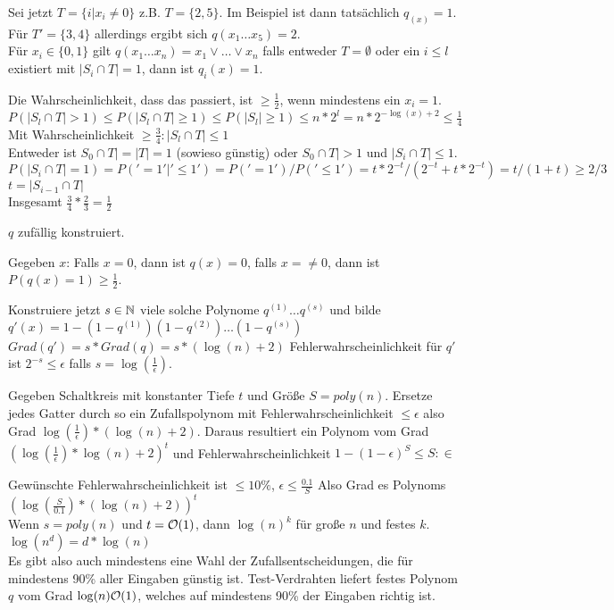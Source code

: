 \begin{beweis}
    Sei jetzt $T = \{i | x_i \neq 0 \}$ z.B. $T = \{2,5\}$.
    Im Beispiel ist dann tatsächlich $q_(x) = 1$.
    Für $T' = \{3,4\}$ allerdings ergibt sich $q(x_1 \dots x_5) = 2$.
    \\
    Für $x_i \in \{0,1\}$ gilt $q(x_1 \dots x_n) = x_1 \lor \dots \lor x_n$
    falls entweder $T = \emptyset$ oder ein $i \leq l$ existiert mit $| S_i \cap
    T | = 1$,
    dann ist $q_i(x) = 1$.

    Die Wahrscheinlichkeit, dass das passiert, ist $\geq \frac{1}{2}$, wenn
    mindestens ein $x_i = 1$.
    \\
    $P(|S_l \cap T| > 1) \leq P(|S_l \cap T| \geq 1) \leq P(|S_l| \geq 1) \leq n
    * 2^l = n * 2^{-\log(x) + 2} \leq \frac{1}{4}$
    \\
    Mit Wahrscheinlichkeit $\geq \frac{3}{4}: |S_l \cap T| \leq 1$
    \\
    Entweder ist $S_0 \cap T| = |T| = 1$ (sowieso günstig) oder $S_0 \cap T| >
    1$ und $|S_i \cap T| \leq 1$.
    \\
    $P(|S_i \cap T| = 1) = P('=1' | '\leq 1') = P('=1') / P('\leq 1') = t *
    2^{-t} / (2^{-t} + t * 2^{-t}) = t / (1 + t) \geq 2/3$
    \\
    $t = |S_{i-1} \cap T|$
    \\
    Insgesamt $\frac{3}{4} * \frac{2}{3} = \frac{1}{2}$

    $q$ zufällig konstruiert.

    Gegeben $x$: Falls $x = 0$, dann ist $q(x) = 0$, falls $x = \neq 0$, dann
    ist $P(q(x) = 1) \geq \frac{1}{2}$.

    Konstruiere jetzt $s \in \mathbb{N}$ viele solche Polynome $q^{(1)} \dots q^{(s)}$
    und bilde
    $q'(x) = 1 - (1 - q^{(1)}) (1 - q^{(2)}) \dots (1 - q^{(s)})$
    \\
    $Grad(q') = s * Grad(q) = s * (\log(n) + 2)$
    Fehlerwahrscheinlichkeit für $q'$ ist $2^{-s} \leq \epsilon$ falls $s =
    \log(\frac{1}{\epsilon})$.

    Gegeben Schaltkreis mit konstanter Tiefe $t$ und Größe $S = poly(n)$.
    Ersetze jedes Gatter durch so ein Zufallspolynom mit
    Fehlerwahrscheinlichkeit $\leq \epsilon$ also Grad $\log(\frac{1}{\epsilon})
    * (\log(n) + 2)$.
    Daraus resultiert ein Polynom vom Grad $(\log(\frac{1}{\epsilon}) * \log(n)
    + 2)^t $ und Fehlerwahrscheinlichkeit $1 - (1 - \epsilon)^S \leq S:\in$

    Gewünschte Fehlerwahrscheinlichkeit ist $\leq 10\%$, $\epsilon \leq
    \frac{0.1}{S}$
    Also Grad es Polynoms $(\log(\frac{S}{0.1}) * (\log(n) + 2))^t$
    \\
    Wenn $s = poly(n)$ und $t = \mathcal{O}(1)$, dann $\log(n)^k$ für große $n$ und
    festes $k$.
    \\
    $\log(n^d) = d * \log(n)$
    \\
    Es gibt also auch mindestens eine Wahl der Zufallsentscheidungen, die für
    mindestens 90\% aller Eingaben günstig ist. Test-Verdrahten liefert festes
    Polynom $q$ vom Grad $\log(n) \mathcal{O}(1)$, welches auf mindestens 90\% der
    Eingaben richtig ist.


\end{beweis}
